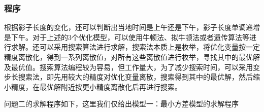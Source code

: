         \subsubsection{程序}
            \par
            根据影子长度的变化，还可以判断出当地时间是上午还是下午，影子长度单调递增是下午。对于上述的3个优化模型，可以使用牛顿法、拟牛顿法或者遗传算法等进行求解。还可以采用搜索算法进行求解，搜索法本质上是枚举，将优化变量按一定精度离散化，得到一系列离散值，对所有这些离散值进行枚举，寻找其中的最优解及最优值。搜索算法编程较为容易，但工作量大，为了减少搜索时间，可以采用变步长搜索法，即先用较大的精度对优化变量离散，搜索得到其中的最优解，然后缩小精度，在最优解附近按更小精度离散化后再进行搜索。
            \par
            问题二的求解程序如下，这里我们仅给出模型一：最小方差模型的求解程序
